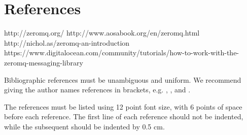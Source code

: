 \documentclass[12pt]{article}
\begin{document}
\section{References}

http://zeromq.org/
http://www.aosabook.org/en/zeromq.html
http://nichol.as/zeromq-an-introduction
https://www.digitalocean.com/community/tutorials/how-to-work-with-the-zeromq-messaging-library

Bibliographic references must be unambiguous and uniform.  We recommend giving
the author names references in brackets, e.g. \cite{knuth:84},
\cite{boulic:91}, and \cite{smith:99}.

The references must be listed using 12 point font size, with 6 points of space
before each reference. The first line of each reference should not be
indented, while the subsequent should be indented by 0.5 cm.



\end{document}
